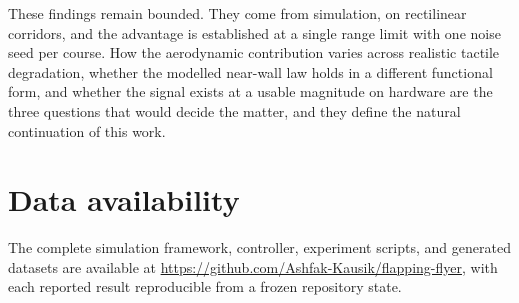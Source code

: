 \documentclass[final,5p,times]{elsarticle}
\begin{document}
These findings remain bounded. They come from simulation, on rectilinear corridors, and the advantage is established at a single range limit with one noise seed per course. How the aerodynamic contribution varies across realistic tactile degradation, whether the modelled near-wall law holds in a different functional form, and whether the signal exists at a usable magnitude on hardware are the three questions that would decide the matter, and they define the natural continuation of this work.

\section*{Data availability}

The complete simulation framework, controller, experiment scripts, and generated datasets are available at \url{https://github.com/Ashfak-Kausik/flapping-flyer}, with each reported result reproducible from a frozen repository state.





\end{document}

